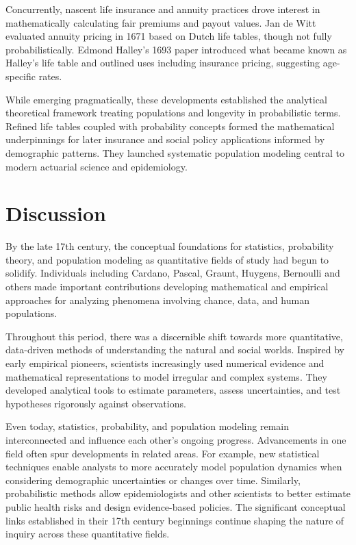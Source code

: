 Concurrently, nascent life insurance and annuity practices drove interest in mathematically calculating fair premiums and payout values. Jan de Witt evaluated annuity pricing in 1671 based on Dutch life tables, though not fully probabilistically. Edmond Halley's 1693 paper introduced what became known as Halley's life table and outlined uses including insurance pricing, suggesting age-specific rates.

While emerging pragmatically, these developments established the analytical theoretical framework treating populations and longevity in probabilistic terms. Refined life tables coupled with probability concepts formed the mathematical underpinnings for later insurance and social policy applications informed by demographic patterns. They launched systematic population modeling central to modern actuarial science and epidemiology.

\section{Discussion}

By the late 17th century, the conceptual foundations for statistics, probability theory, and population modeling as quantitative fields of study had begun to solidify. Individuals including Cardano, Pascal, Graunt, Huygens, Bernoulli and others made important contributions developing mathematical and empirical approaches for analyzing phenomena involving chance, data, and human populations.

Throughout this period, there was a discernible shift towards more quantitative, data-driven methods of understanding the natural and social worlds. Inspired by early empirical pioneers, scientists increasingly used numerical evidence and mathematical representations to model irregular and complex systems. They developed analytical tools to estimate parameters, assess uncertainties, and test hypotheses rigorously against observations.

Even today, statistics, probability, and population modeling remain interconnected and influence each other's ongoing progress. Advancements in one field often spur developments in related areas. For example, new statistical techniques enable analysts to more accurately model population dynamics when considering demographic uncertainties or changes over time. Similarly, probabilistic methods allow epidemiologists and other scientists to better estimate public health risks and design evidence-based policies. The significant conceptual links established in their 17th century beginnings continue shaping the nature of inquiry across these quantitative fields.